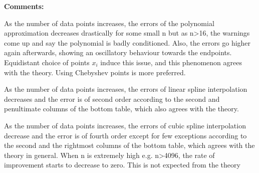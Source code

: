 \documentclass[12pt]{article}
\begin{document}
\textbf{Comments:}

As the number of data points increases, the errors of the polynomial approximation decreases drastically for some small n but as n>16, the warnings come up and say the polynomial is badly conditioned. Also, the errors go higher again afterwards, showing an oscillatory behaviour towards the endpoints. Equidistant choice of points $x_i$ induce this issue, and this phenomenon agrees with the theory. Using Chebyshev points is more preferred.

As the number of data points increases, the errors of linear spline interpolation decreases and the error is of second order according to the second and penultimate columns of the bottom table, which also agrees with the theory.

As the number of data points increases, the errors of cubic spline interpolation decrease and the error is of fourth order except for few exceptions according to the second and the rightmost columns of the bottom table, which agrees with the theory in general. When n is extremely high e.g. n>4096, the rate of improvement starts to decrease to zero. This is not expected from the theory
\end{document}
